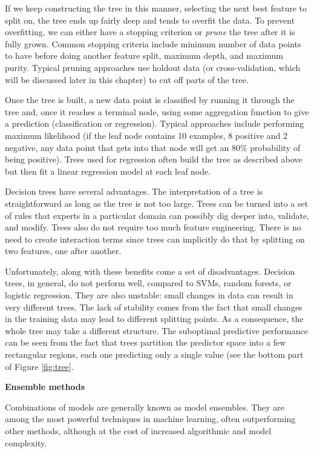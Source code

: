 \documentclass[]{krantz}
\begin{document}
If we keep constructing the tree in this manner, selecting the next best
feature to split on, the tree ends up fairly deep and tends to overfit
the data. To prevent overfitting, we can either have a stopping
criterion or \emph{prune} the tree after it is fully grown. Common
stopping criteria include minimum number of data points to have before
doing another feature split, maximum depth, and maximum purity. Typical
pruning approaches use holdout data (or cross-validation, which will be
discussed later in this chapter) to cut off parts of the tree.

Once the tree is built, a new data point is classified by running it
through the tree and, once it reaches a terminal node, using some
aggregation function to give a prediction (classification or
regression). Typical approaches include performing maximum likelihood
(if the leaf node contains 10 examples, 8 positive and 2 negative, any
data point that gets into that node will get an 80\% probability of
being positive). Trees used for regression often build the tree as
described above but then fit a linear regression model at each leaf
node.

Decision trees have several advantages. The interpretation of a tree is
straightforward as long as the tree is not too large. Trees can be
turned into a set of rules that experts in a particular domain can
possibly dig deeper into, validate, and modify. Trees also do not
require too much feature engineering. There is no need to create
interaction terms since trees can implicitly do that by splitting on two
features, one after another.

Unfortunately, along with these benefits come a set of disadvantages.
Decision trees, in general, do not perform well, compared to SVMs,
random forests, or logistic regression. They are also unstable: small
changes in data can result in very different trees. The lack of
stability comes from the fact that small changes in the training data
may lead to different splitting points. As a consequence, the whole tree
may take a different structure. The suboptimal predictive performance
can be seen from the fact that trees partition the predictor space into
a few rectangular regions, each one predicting only a single value (see
the bottom part of Figure \ref{fig:tree}.

\textbf{Ensemble methods}

Combinations of models are generally known as model ensembles. They are
among the most powerful techniques in machine learning, often
outperforming other methods, although at the cost of increased
algorithmic and model complexity.
\end{document}
